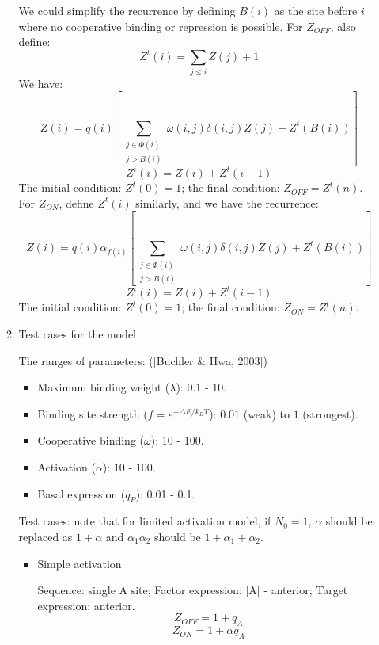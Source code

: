 \documentclass[11pt]{article}
\begin{document}
\begin{enumerate}
\begin{enumerate}
We could simplify the recurrence by defining $B(i)$ as the site before $i$ where no cooperative binding or repression is possible. For $Z_{OFF}$, also define: 
\begin{equation}
Z^t(i) = \sum_{j \leq i} Z(j) + 1
\end{equation}
We have: 
\begin{equation}
Z(i) = q(i) \left[ \sum_{\substack{j \in \Phi(i)\\j > B(i)}} \omega(i,j) \delta(i,j) Z(j) + Z^t(B(i)) \right]	
\end{equation}
\begin{equation}
Z^t(i) = Z(i) + Z^t(i-1)
\end{equation}
The initial condition: $Z^t(0) = 1$; the final condition: $Z_{OFF} = Z^t(n)$. For $Z_{ON}$, define $Z^t(i)$ similarly, and we have the recurrence: 
\begin{equation}
Z(i) = q(i) \alpha_{f(i)} \left[ \sum_{\substack{j \in \Phi(i)\\j > B(i)}} \omega(i,j) \delta(i,j) Z(j) + Z^t(B(i)) \right]	
\end{equation}
\begin{equation}
Z^t(i) = Z(i) + Z^t(i-1)
\end{equation}
The initial condition: $Z^t(0) = 1$; the final condition: $Z_{ON} = Z^t(n)$. 

\item{Test cases for the model}

The ranges of parameters: ([Buchler \& Hwa, 2003])
\begin{itemize}
\item Maximum binding weight ($\lambda$): 0.1 - 10.
\item Binding site strength ($f = e^{-\Delta E/k_B T}$): $0.01$ (weak) to $1$ (strongest).  
\item Cooperative binding ($\omega$): 10 - 100. 
\item Activation ($\alpha$): 10 - 100. 
\item Basal expression ($q_P$): 0.01 - 0.1. 
\end{itemize}

Test cases: note that for limited activation model, if $N_0 = 1$, $\alpha$ should be replaced as $1 + \alpha$ and $\alpha_1 \alpha_2$ should be $1 + \alpha_1 + \alpha_2$. 

\begin{itemize}
\item{Simple activation}

Sequence: single A site; Factor expression: [A] - anterior; Target expression: anterior. 
\begin{equation}
Z_{OFF} = 1 + q_A
\end{equation}
\begin{equation}
Z_{ON} = 1 + \alpha q_A
\end{equation}


\end{itemize}
\end{enumerate}
\end{enumerate}
\end{document}
